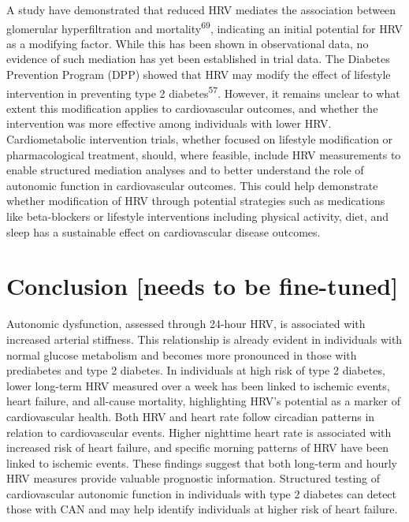 \documentclass[
  a4paper,
  headsepline=true,
  open=any]{scrbook}
\begin{document}
A study have demonstrated that reduced HRV mediates the association
between glomerular hyperfiltration and mortality\textsuperscript{69},
indicating an initial potential for HRV as a modifying factor. While
this has been shown in observational data, no evidence of such mediation
has yet been established in trial data. The Diabetes Prevention Program
(DPP) showed that HRV may modify the effect of lifestyle intervention in
preventing type 2 diabetes\textsuperscript{57}. However, it remains
unclear to what extent this modification applies to cardiovascular
outcomes, and whether the intervention was more effective among
individuals with lower HRV. Cardiometabolic intervention trials, whether
focused on lifestyle modification or pharmacological treatment, should,
where feasible, include HRV measurements to enable structured mediation
analyses and to better understand the role of autonomic function in
cardiovascular outcomes. This could help demonstrate whether
modification of HRV through potential strategies such as medications
like beta-blockers or lifestyle interventions including physical
activity, diet, and sleep has a sustainable effect on cardiovascular
disease outcomes.


\hypertarget{conclusion-needs-to-be-fine-tuned}{%
\chapter{Conclusion {[}needs to be
fine-tuned{]}}\label{conclusion-needs-to-be-fine-tuned}}

Autonomic dysfunction, assessed through 24-hour HRV, is associated with
increased arterial stiffness. This relationship is already evident in
individuals with normal glucose metabolism and becomes more pronounced
in those with prediabetes and type 2 diabetes. In individuals at high
risk of type 2 diabetes, lower long-term HRV measured over a week has
been linked to ischemic events, heart failure, and all-cause mortality,
highlighting HRV's potential as a marker of cardiovascular health. Both
HRV and heart rate follow circadian patterns in relation to
cardiovascular events. Higher nighttime heart rate is associated with
increased risk of heart failure, and specific morning patterns of HRV
have been linked to ischemic events. These findings suggest that both
long-term and hourly HRV measures provide valuable prognostic
information. Structured testing of cardiovascular autonomic function in
individuals with type 2 diabetes can detect those with CAN and may help
identify individuals at higher risk of heart failure.
\end{document}
